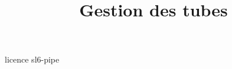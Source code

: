 \documentclass [xcolor=table] {beamer}
\title {Gestion des tubes}
\begin{document}
 {licence}
 {sl6-pipe}
\end{document}
